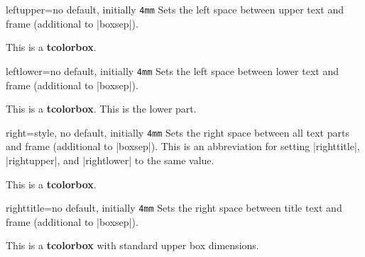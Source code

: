 \begin{docTcbKey}{leftupper}{=}{no default, initially \texttt{4mm}}
  Sets the left space between upper text and frame (additional to |boxsep|).
\begin{dispExample}

\begin{tcolorbox}[leftupper=3cm,title=My Title]
This is a \textbf{tcolorbox}.
\end{tcolorbox}
\end{dispExample}
\end{docTcbKey}

\begin{docTcbKey}{leftlower}{=}{no default, initially \texttt{4mm}}
  Sets the left space between lower text and frame (additional to |boxsep|).
\begin{dispExample}

\begin{tcolorbox}[leftlower=3cm]
This is a \textbf{tcolorbox}.
\tcblower
This is the lower part.
\end{tcolorbox}
\end{dispExample}
\end{docTcbKey}


\clearpage
\begin{docTcbKey}{right}{=}{style, no default, initially \texttt{4mm}}
  Sets the right space between all text parts and frame (additional to |boxsep|).
  This is an abbreviation for setting
  |righttitle|, |rightupper|, and |rightlower| to the same value.
\begin{dispExample}

\begin{tcolorbox}[width=5cm,right=2cm]
This is a \textbf{tcolorbox}.
\end{tcolorbox}
\end{dispExample}
\end{docTcbKey}



\begin{docTcbKey}{righttitle}{=}{no default, initially \texttt{4mm}}
  Sets the right space between title text and frame (additional to |boxsep|).
\begin{dispExample}

\begin{tcolorbox}[width=5cm,righttitle=2cm,title=My very long title text]
This is a \textbf{tcolorbox} with standard upper box dimensions.
\end{tcolorbox}
\end{dispExample}
\end{docTcbKey}


